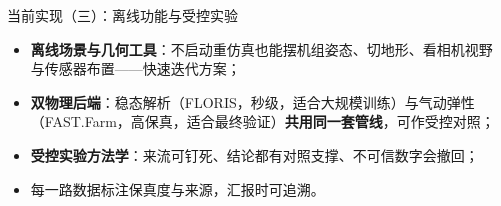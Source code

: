 \documentclass[aspectratio=169,10pt,UTF8]{ctexbeamer}
\newcommand{\hl}[1]{{\color{myblue}\bfseries #1}}
\begin{document}
\begin{frame}{当前实现（三）：离线功能与受控实验}
  \begin{itemize}\small
    \item \hl{离线场景与几何工具}：不启动重仿真也能摆机组姿态、切地形、看相机视野
          与传感器布置——快速迭代方案；
    \item \hl{双物理后端}：稳态解析（FLORIS，秒级，适合大规模训练）与气动弹性
          （FAST.Farm，高保真，适合最终验证）\textbf{共用同一套管线}，可作受控对照；
    \item \hl{受控实验方法学}：来流可钉死、结论都有对照支撑、不可信数字会撤回；
    \item 每一路数据标注保真度与来源，汇报时可追溯。
  \end{itemize}
\end{frame}
\end{document}
